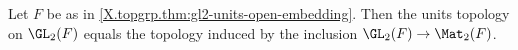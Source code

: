 Let $F$ be as in \cref{X.topgrp.thm:gl2-units-open-embedding}. Then the units topology on $\GL_2(F)$ equals the
topology induced by the inclusion $\GL_2(F)\to\Mat_2(F)$.
